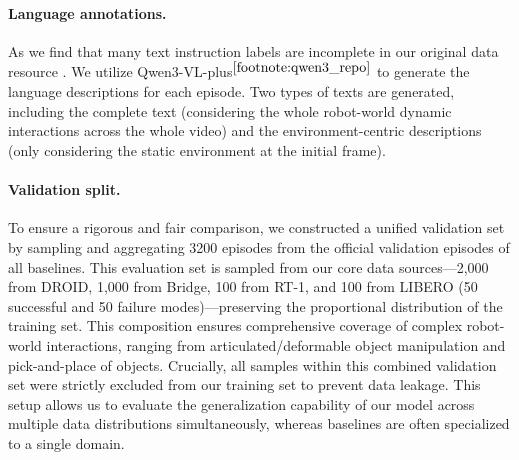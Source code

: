 \begin{appendices}
\paragraph{Language annotations.}
As we find that many text instruction labels are incomplete in our original data resource \cite{khazatsky2024droid,walke2023bridgedata,brohan2022rt}. We utilize Qwen3-VL-plus$^{\ref{footnote:qwen3_repo}}$ \cite{Qwen3-VL} to generate the language descriptions for each episode. 
Two types of texts are generated, including the complete text (considering the whole robot-world dynamic interactions across the whole video) and the environment-centric descriptions (only considering the static environment at the initial frame).

\paragraph{Validation split.}
To ensure a rigorous and fair comparison, we constructed a unified validation set by sampling and aggregating 3200 episodes from the official validation episodes of all baselines. This evaluation set is sampled from our core data sources—2,000 from DROID, 1,000 from Bridge, 100 from RT-1, and 100 from LIBERO (50 successful and 50 failure modes)—preserving the proportional distribution of the training set. This composition ensures comprehensive coverage of complex robot-world interactions, ranging from articulated/deformable object manipulation and pick-and-place of objects. Crucially, all samples within this combined validation set were strictly excluded from our training set to prevent data leakage. This setup allows us to evaluate the generalization capability of our model across multiple data distributions simultaneously, whereas baselines are often specialized to a single domain. 


\end{appendices}
